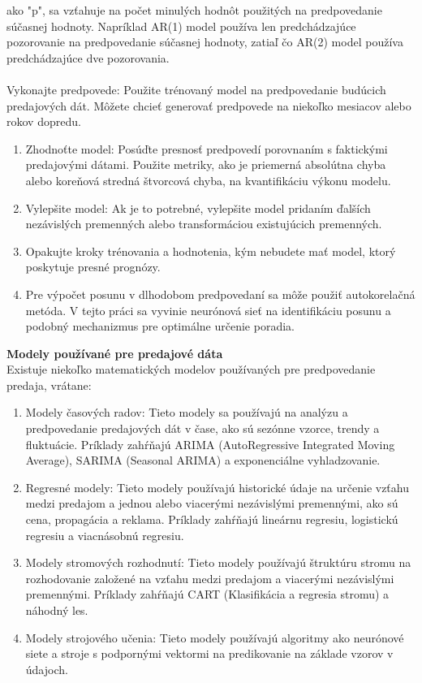     ako "p", sa vzťahuje na počet minulých hodnôt použitých na predpovedanie súčasnej hodnoty. Napríklad AR(1) model
    používa len predchádzajúce pozorovanie na predpovedanie súčasnej hodnoty, zatiaľ čo AR(2) model používa predchádzajúce
    dve pozorovania.\\
    \\
    Vykonajte predpovede: Použite trénovaný model na predpovedanie budúcich predajových dát. Môžete chcieť generovať
    predpovede na niekoľko mesiacov alebo rokov dopredu.
    \begin{enumerate}
        \item Zhodnoťte model: Posúďte presnosť predpovedí porovnaním s faktickými predajovými dátami. Použite metriky,
        ako je priemerná absolútna chyba alebo koreňová stredná štvorcová chyba, na kvantifikáciu výkonu modelu.
        \item Vylepšite model: Ak je to potrebné, vylepšite model pridaním ďalších nezávislých premenných alebo
        transformáciou existujúcich premenných.
        \item Opakujte kroky trénovania a hodnotenia, kým nebudete mať model, ktorý poskytuje presné prognózy.
        \item Pre výpočet posunu v dlhodobom predpovedaní sa môže použiť autokorelačná metóda. V tejto práci sa
        vyvinie neurónová sieť na identifikáciu posunu a podobný mechanizmus pre optimálne určenie poradia.
    \end{enumerate}
    \textbf{Modely používané pre predajové dáta} \\
    Existuje niekoľko matematických modelov používaných pre predpovedanie predaja, vrátane:\\
    \begin{enumerate}
        \item Modely časových radov: Tieto modely sa používajú na analýzu a predpovedanie predajových dát v čase,
        ako sú sezónne vzorce, trendy a fluktuácie. Príklady zahŕňajú ARIMA (AutoRegressive Integrated Moving Average),
        SARIMA (Seasonal ARIMA) a exponenciálne vyhladzovanie.
        \item Regresné modely: Tieto modely používajú historické údaje na určenie vzťahu medzi predajom a jednou alebo
        viacerými nezávislými premennými, ako sú cena, propagácia a reklama. Príklady zahŕňajú lineárnu regresiu,
        logistickú regresiu a viacnásobnú regresiu.
        \item Modely stromových rozhodnutí: Tieto modely používajú štruktúru stromu na rozhodovanie založené na vzťahu medzi
        predajom a viacerými nezávislými premennými. Príklady zahŕňajú CART (Klasifikácia a regresia stromu) a náhodný les.
        \item Modely strojového učenia: Tieto modely používajú algoritmy ako neurónové siete a stroje s podpornými
        vektormi na predikovanie na základe vzorov v údajoch.
    \end{enumerate}
